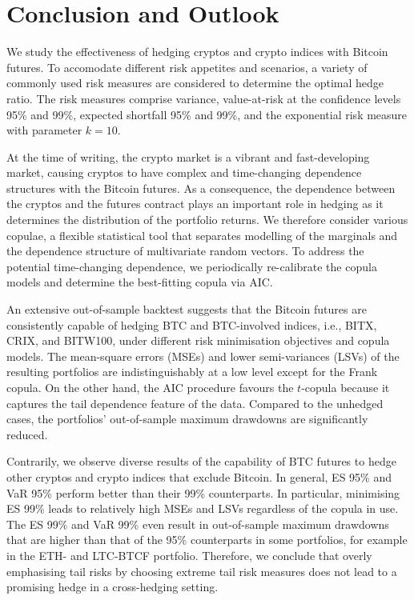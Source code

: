 \section{Conclusion and Outlook}\label{sec:conclusion-and-outlook}
We study the effectiveness of hedging cryptos and crypto indices with
Bitcoin futures.
To accomodate different risk appetites and scenarios, a variety of
commonly used risk measures are considered to determine the optimal
hedge ratio. The risk measures comprise variance, value-at-risk at
the confidence levels 95\% and 99\%, expected shortfall 95\% and 99\%,
and the exponential risk measure with parameter $k=10$.

At the time of writing, the crypto market is a vibrant and
fast-developing market, causing cryptos to have complex and
time-changing dependence structures with the Bitcoin futures.
As a consequence, the dependence between the cryptos and the futures
contract plays an important role in hedging as it determines the
distribution of the portfolio returns. We therefore consider various
copulae, a flexible statistical tool that separates modelling of the
marginals and the dependence structure of multivariate random
vectors. To address the potential time-changing dependence, we
periodically re-calibrate the copula models and determine the
best-fitting copula via AIC. 

An extensive out-of-sample backtest suggests that the Bitcoin futures
are consistently capable of hedging BTC and BTC-involved indices,
i.e., BITX, CRIX, and BITW100, under different risk minimisation
objectives 
and copula models. The mean-square errors (MSEs) and lower
semi-variances (LSVs) of the resulting portfolios are
indistinguishably at a low level except for the Frank copula. 
On the other hand, the AIC procedure favours the $t$-copula because it 
captures the tail dependence feature of the data.
Compared to the unhedged cases, the
portfolios' out-of-sample maximum drawdowns are significantly reduced. 

Contrarily, we observe diverse results of the capability of BTC
futures to hedge other cryptos and crypto indices that exclude Bitcoin. 
In general, ES 95\% and VaR 95\% perform better than their 99\%
counterparts. In particular, minimising ES 99\% leads to relatively
high MSEs and LSVs regardless of the copula in use. The ES 99\% and
VaR 99\% even result in out-of-sample maximum drawdowns that are
higher than that of the 95\% counterparts in some portfolios, 
for example in the ETH- and LTC-BTCF portfolio.
Therefore, we conclude that overly emphasising tail risks by choosing
extreme tail risk measures does not lead to a promising hedge in a
cross-hedging setting. 

